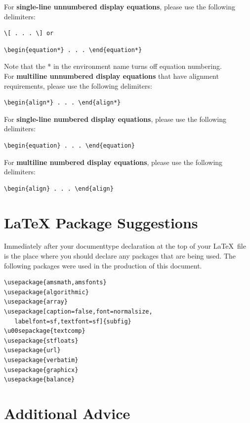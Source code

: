 \documentclass[lettersize,journal]{IEEEtran}
\begin{document}
For {\bf{single-line unnumbered display equations}}, please use the following delimiters: 
\begin{verbatim}\[ . . . \] or \end{verbatim} 
\begin{verbatim}\begin{equation*} . . . \end{equation*}\end{verbatim}
Note that the * in the environment name turns off equation numbering.\\

For {\bf{multiline unnumbered display equations}} that have alignment requirements, please use the following delimiters: 
\begin{verbatim}
\begin{align*} . . . \end{align*}
\end{verbatim}

For {\bf{single-line numbered display equations}}, please use the following delimiters: 
\begin{verbatim}
\begin{equation} . . . \end{equation}
\end{verbatim}

For {\bf{multiline numbered display equations}}, please use the following delimiters: 
\begin{verbatim}
\begin{align} . . . \end{align}
\end{verbatim}

\section{LaTeX Package Suggestions}
\noindent Immediately after your documenttype declaration at the top of your \LaTeX\ file is the place where you should declare any packages that are being used. The following packages were used in the production of this document.
\begin{verbatim}
\usepackage{amsmath,amsfonts}
\usepackage{algorithmic}
\usepackage{array}
\usepackage[caption=false,font=normalsize,
   labelfont=sf,textfont=sf]{subfig}
\u00sepackage{textcomp}
\usepackage{stfloats}
\usepackage{url}
\usepackage{verbatim}
\usepackage{graphicx}
\usepackage{balance}
\end{verbatim}

\section{Additional Advice}
\end{document}
